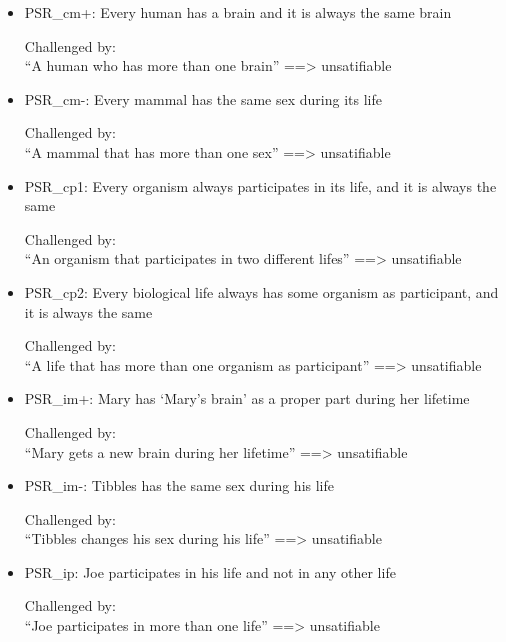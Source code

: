 \begin{itemize}

\item PSR\_cm+: Every human has a brain and it is always the same brain

Challenged by: \\``A human who has more than one brain''  ==> unsatifiable






\item PSR\_cm-: Every mammal has the same sex during its life

Challenged by: \\``A mammal that has more than one sex''  ==> unsatifiable

 
\item PSR\_cp1: Every organism always participates in its life, and it is always the same

Challenged by: \\``An  organism that participates in two different lifes''  ==> unsatifiable


\item PSR\_cp2: Every biological life always has some organism as participant, and it is always the same

Challenged by: \\``A life that has more than one organism as participant''  ==> unsatifiable


\item PSR\_im+: Mary has `Mary's brain' as a proper part during her lifetime 

Challenged by: \\``Mary gets a new brain during her lifetime''  ==> unsatifiable


\item PSR\_im-: Tibbles has the same sex during his life 

Challenged by: \\``Tibbles changes his sex during his life''  ==> unsatifiable


\item PSR\_ip: Joe participates in his life and not in any other life

Challenged by: \\``Joe participates in more than one life''  ==> unsatifiable



\end{itemize}
